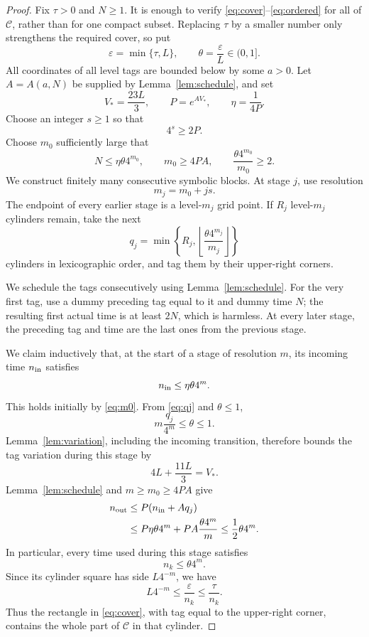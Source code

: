\documentclass[11pt]{article}
\newcommand{\C}{\mathcal C}
\begin{document}
\begin{proof}
Fix \(\tau>0\) and \(N\geq1\).  It is enough to verify
\eqref{eq:cover}--\eqref{eq:ordered} for all of \(\C\), rather than for one
compact subset.  Replacing \(\tau\) by a smaller number only strengthens the
required cover, so put
\[
 \varepsilon=\min\{\tau,L\},\qquad
 \theta=\frac{\varepsilon}{L}\in(0,1].
\]
All coordinates of all level tags are bounded below by some \(a>0\).
Let \(A=A(a,N)\) be supplied by Lemma~\ref{lem:schedule}, and set
\[
 V_*=\frac{23L}{3},\qquad P=e^{AV_*},\qquad
 \eta=\frac1{4P}.
\]
Choose an integer \(s\geq1\) so that
\[
 4^s\geq2P.
\]
Choose \(m_0\) sufficiently large that
\begin{equation}
 N\leq\eta\theta4^{m_0},\qquad
 m_0\geq4PA,\qquad
 \frac{\theta4^{m_0}}{m_0}\geq2.
\label{eq:m0}
\end{equation}
We construct finitely many consecutive symbolic blocks.  At stage \(j\),
use resolution
\[
 m_j=m_0+js.
\]
The endpoint of every earlier stage is a level-\(m_j\) grid point.  If
\(R_j\) level-\(m_j\) cylinders remain, take the next
\begin{equation}
 q_j=\min\left\{
 R_j,\left\lfloor\frac{\theta4^{m_j}}{m_j}\right\rfloor
 \right\}
\label{eq:qj}
\end{equation}
cylinders in lexicographic order, and tag them by their upper-right corners.

We schedule the tags consecutively using Lemma~\ref{lem:schedule}.  For the
very first tag, use a dummy preceding tag equal to it and dummy time \(N\);
the resulting first actual time is at least \(2N\), which is harmless.
At every later stage, the preceding tag and time are the last ones from the
previous stage.

We claim inductively that, at the start of a stage of resolution \(m\), its
incoming time \(n_{\rm in}\) satisfies
\begin{equation}
 n_{\rm in}\leq\eta\theta4^m.
\label{eq:invariant}
\end{equation}
This holds initially by \eqref{eq:m0}.  From \eqref{eq:qj} and
\(\theta\leq1\),
\[
 m\frac{q_j}{4^m}\leq\theta\leq1.
\]
Lemma~\ref{lem:variation}, including the incoming transition, therefore
bounds the tag variation during this stage by
\[
 4L+\frac{11L}{3}=V_*.
\]
Lemma~\ref{lem:schedule} and \(m\geq m_0\geq4PA\) give
\begin{align}
 n_{\rm out}
 &\leq P(n_{\rm in}+Aq_j)\\
 &\leq
 P\eta\theta4^m+
 PA\frac{\theta4^m}{m}
 \leq \frac12\theta4^m.
\label{eq:out}
\end{align}
In particular, every time used during this stage satisfies
\[
 n_k\leq\theta4^m.
\]
Since its cylinder square has side \(L4^{-m}\), we have
\[
 L4^{-m}\leq\frac{\varepsilon}{n_k}\leq\frac{\tau}{n_k}.
\]
Thus the rectangle in \eqref{eq:cover}, with tag equal to the upper-right
corner, contains the whole part of \(\C\) in that cylinder.


\end{proof}
\end{document}

